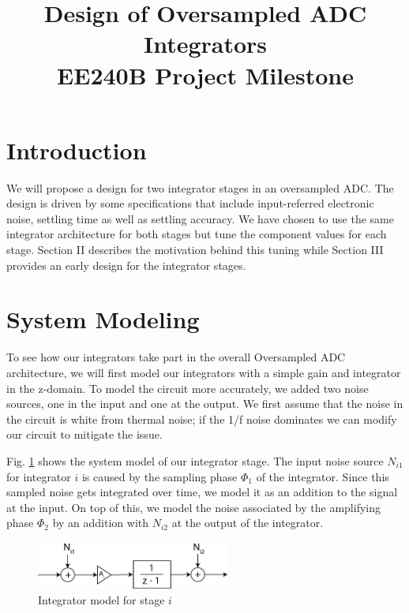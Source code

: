 \documentclass[conference]{IEEEtran}
\begin{document}
\title{Design of Oversampled ADC Integrators \\ \Large EE240B Project Milestone}
\author{
\and
{}
}
\maketitle

\section{Introduction}

We will propose a design for two integrator stages in an oversampled ADC. The design is driven by some specifications that include input-referred electronic noise, settling time as well as settling accuracy. We have chosen to use the same integrator architecture for both stages but tune the component values for each stage. Section II describes the motivation behind this tuning while Section III provides an early design for the integrator stages.



\section{System Modeling}

To see how our integrators take part in the overall Oversampled ADC architecture, we will first model our integrators with a simple gain and integrator in the z-domain. To model the circuit more accurately, we added two noise sources, one in the input and one at the output. We first assume that the noise in the circuit is white from thermal noise; if the 1/f noise dominates we can modify our circuit to mitigate the issue.

Fig. \ref{integrator-model} shows the system model of our integrator stage. The input noise source $N_{i1}$ for integrator $i$ is caused by the sampling phase $\Phi_1$ of the integrator. Since this sampled noise gets integrated over time, we model it as an addition to the signal at the input. On top of this, we model the noise associated by the amplifying phase $\Phi_2$ by an addition with $N_{i2}$ at the output of the integrator.

\begin{figure}[!h]
\centering
\includegraphics[width=2.5in]{img/integrator-model}
\caption{Integrator model for stage $i$}
\label{integrator-model}
\end{figure}
\end{document}
